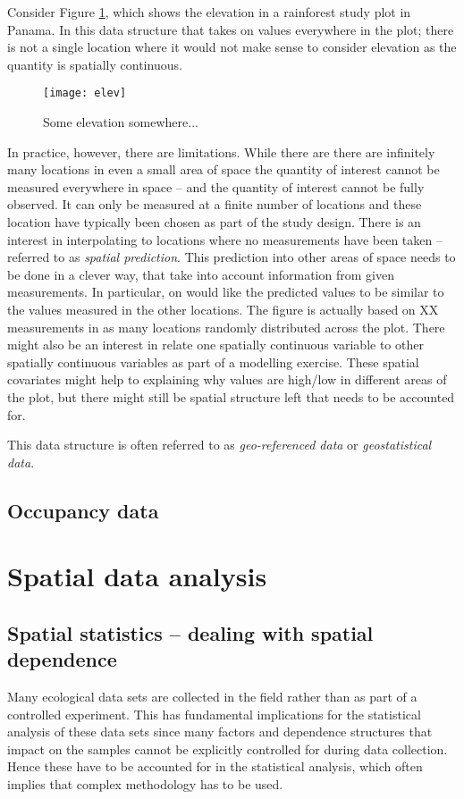 Consider Figure \ref{fig:elev}, which shows the elevation in a rainforest study plot in Panama. In this data structure that  takes on values everywhere in the plot; there is not a single location where it would not make sense to consider elevation as the quantity is spatially continuous.
\begin{figure}
\centering
\texttt{[image: elev]}
\caption{\label{fig:elev} Some elevation somewhere...}
\end{figure}
In practice, however, there are limitations. While there are there are infinitely many locations in even a small area of space the quantity of interest cannot be measured everywhere in space -- and the quantity of interest cannot be fully observed. It can only be measured at a finite number of locations and these location have typically been chosen as part of the study design. There is an interest in interpolating to locations where no measurements have been taken -- referred to as \textit{spatial prediction}. This prediction into other areas of space needs to be done in a clever way, that take into account information from given measurements. In particular, on would like the predicted values to be similar to the values measured in the other locations. The figure is actually based on XX measurements in as many locations randomly distributed across the plot. There might also be an interest in relate one spatially continuous variable to other spatially continuous variables as part of a modelling exercise. These spatial covariates might help to explaining why values are high/low in different areas of the plot, but there might still be spatial structure left that needs to be accounted for.

This data structure is often referred to as \textit{geo-referenced data} or \textit{geostatistical data}.


\subsection{Occupancy data}


\section{Spatial data analysis}

\subsection{Spatial statistics -- dealing with spatial dependence}
Many ecological data sets are collected in the field rather than as part of a controlled experiment.  This has fundamental implications for the statistical analysis of these data sets since many factors and dependence structures that impact on the samples cannot be explicitly controlled for during data collection. Hence these have to be accounted for in the statistical analysis, which often implies that complex methodology has to be used.

